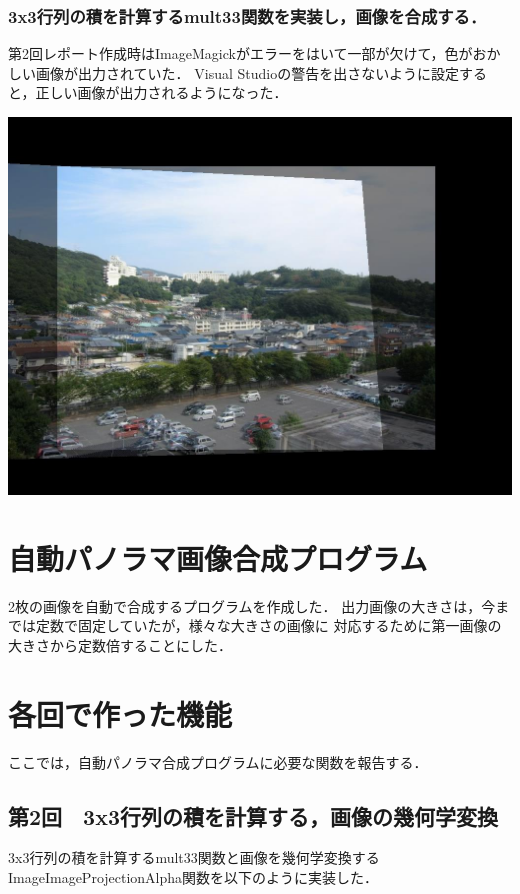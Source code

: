 \documentclass[11pt]{jarticle}
\begin{document}
\subsubsection{3x3行列の積を計算するmult33関数を実装し，画像を合成する．}

第2回レポート作成時はImageMagickがエラーをはいて一部が欠けて，色がおかしい画像が出力されていた．
Visual Studioの警告を出さないように設定すると，正しい画像が出力されるようになった．

\includegraphics[scale=.6]{./img/dai2out.jpg}

\section{自動パノラマ画像合成プログラム}

2枚の画像を自動で合成するプログラムを作成した．
出力画像の大きさは，今までは定数で固定していたが，様々な大きさの画像に
対応するために第一画像の大きさから定数倍することにした．

\section{各回で作った機能}

ここでは，自動パノラマ合成プログラムに必要な関数を報告する．

\subsection{第2回　3x3行列の積を計算する，画像の幾何学変換}

3x3行列の積を計算するmult33関数と画像を幾何学変換する
ImageImageProjectionAlpha関数を以下のように実装した．
\end{document}
